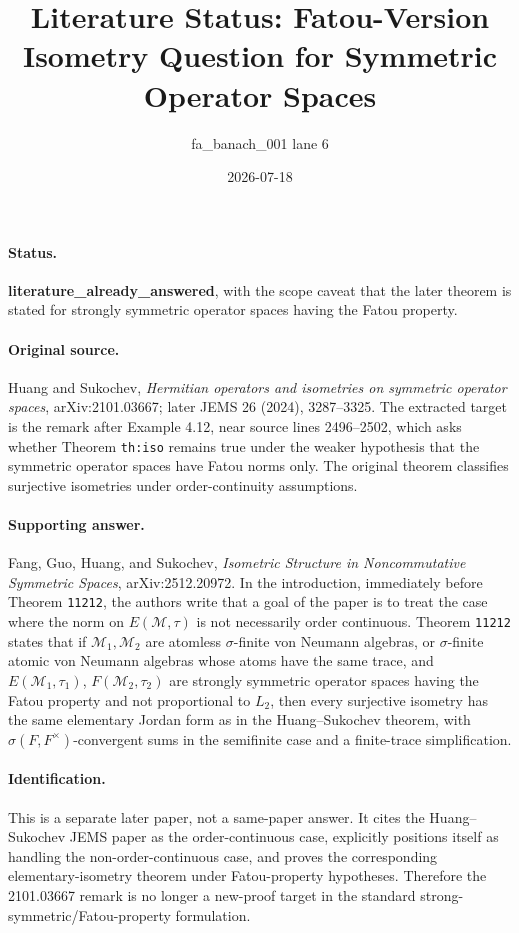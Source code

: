 \documentclass[11pt]{article}
\title{Literature Status: Fatou-Version Isometry Question for Symmetric Operator Spaces}
\author{fa\_banach\_001 lane 6}
\date{2026-07-18}
\begin{document}
\maketitle

\paragraph{Status.}
\textbf{literature\_already\_answered}, with the scope caveat that the later theorem is stated for strongly symmetric operator spaces having the Fatou property.

\paragraph{Original source.}
Huang and Sukochev, \emph{Hermitian operators and isometries on symmetric operator spaces}, arXiv:2101.03667; later JEMS 26 (2024), 3287--3325.  The extracted target is the remark after Example 4.12, near source lines 2496--2502, which asks whether Theorem \verb|th:iso| remains true under the weaker hypothesis that the symmetric operator spaces have Fatou norms only.  The original theorem classifies surjective isometries under order-continuity assumptions.

\paragraph{Supporting answer.}
Fang, Guo, Huang, and Sukochev, \emph{Isometric Structure in Noncommutative Symmetric Spaces}, arXiv:2512.20972.  In the introduction, immediately before Theorem \verb|11212|, the authors write that a goal of the paper is to treat the case where the norm on \(E(\mathcal M,\tau)\) is not necessarily order continuous.  Theorem \verb|11212| states that if \(\mathcal M_1,\mathcal M_2\) are atomless \(\sigma\)-finite von Neumann algebras, or \(\sigma\)-finite atomic von Neumann algebras whose atoms have the same trace, and \(E(\mathcal M_1,\tau_1)\), \(F(\mathcal M_2,\tau_2)\) are strongly symmetric operator spaces having the Fatou property and not proportional to \(L_2\), then every surjective isometry has the same elementary Jordan form as in the Huang--Sukochev theorem, with \(\sigma(F,F^\times)\)-convergent sums in the semifinite case and a finite-trace simplification.

\paragraph{Identification.}
This is a separate later paper, not a same-paper answer.  It cites the Huang--Sukochev JEMS paper as the order-continuous case, explicitly positions itself as handling the non-order-continuous case, and proves the corresponding elementary-isometry theorem under Fatou-property hypotheses.  Therefore the 2101.03667 remark is no longer a new-proof target in the standard strong-symmetric/Fatou-property formulation.
\end{document}
